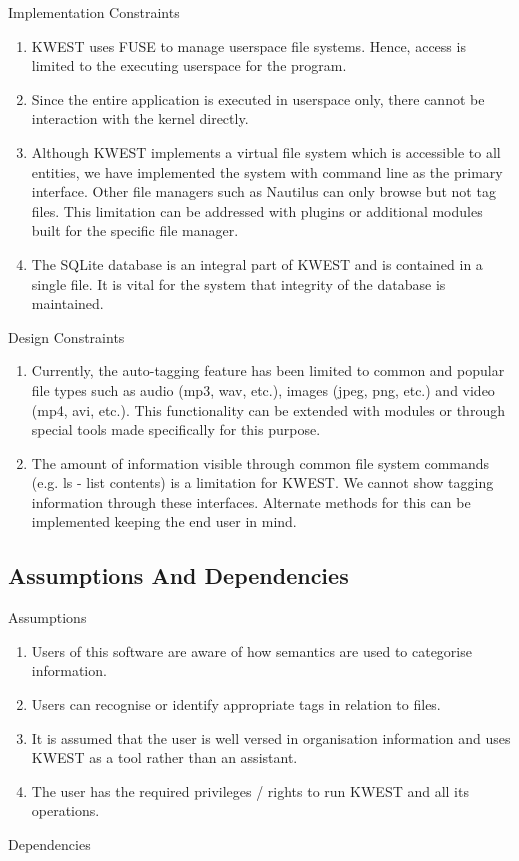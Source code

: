 Implementation Constraints
\begin{enumerate}
\item KWEST uses FUSE to manage userspace file systems. Hence, access is limited to the
executing userspace for the program.
 \item Since the entire application is executed in userspace only, there cannot be interaction
with the kernel directly.
\item Although KWEST implements a virtual file system which is accessible to all entities,
we have implemented the system with command line as the primary interface. Other
file managers such as Nautilus can only browse but not tag files. This limitation can
be addressed with plugins or additional modules built for the specific file manager.
\item The SQLite database is an integral part of KWEST and is contained in a single file. It
is vital for the system that integrity of the database is maintained.
\end{enumerate}
Design Constraints

\begin{enumerate}

\item Currently, the auto-tagging feature has been limited to common and popular file
types such as audio (mp3, wav, etc.), images (jpeg, png, etc.) and video (mp4, avi,
etc.). This functionality can be extended with modules or through special tools
made specifically for this purpose.

\item The amount of information visible through common file system commands (e.g.
ls - list contents) is a limitation for KWEST. We cannot show tagging information
through these interfaces. Alternate methods for this can be implemented keeping
the end user in mind.
\end{enumerate}


\subsection{ Assumptions And Dependencies}

Assumptions
\begin{enumerate}
\item Users of this software are aware of how semantics are used to categorise
information.
\item Users can recognise or identify appropriate tags in relation to files.
\item It is assumed that the user is well versed in organisation information and uses KWEST
as a tool rather than an assistant.
\item The user has the required privileges / rights to run KWEST and all its operations.
\end{enumerate}
Dependencies

